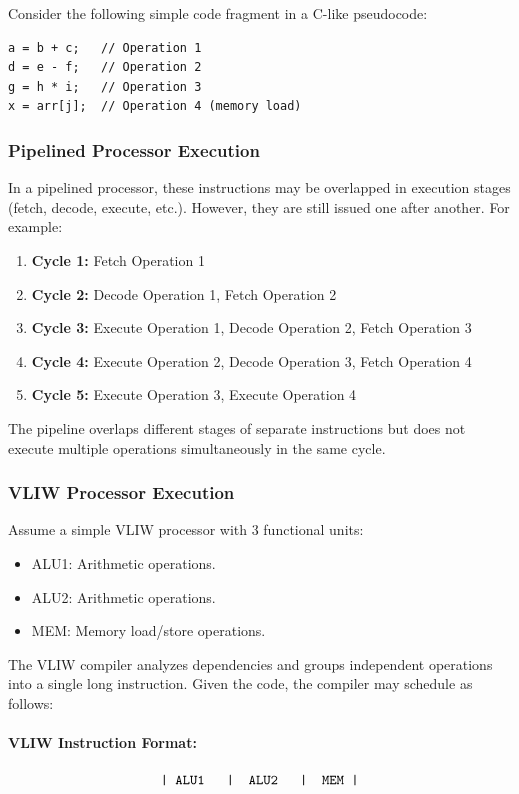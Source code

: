 Consider the following simple code fragment in a C-like pseudocode:
\begin{verbatim}
a = b + c;   // Operation 1
d = e - f;   // Operation 2
g = h * i;   // Operation 3
x = arr[j];  // Operation 4 (memory load)
\end{verbatim}

\subsubsection*{Pipelined Processor Execution}
In a pipelined processor, these instructions may be overlapped in execution stages (fetch, decode, execute, etc.). However, they are still issued one after another. For example:
\begin{enumerate}
    \item \textbf{Cycle 1:} Fetch Operation 1
    \item \textbf{Cycle 2:} Decode Operation 1, Fetch Operation 2
    \item \textbf{Cycle 3:} Execute Operation 1, Decode Operation 2, Fetch Operation 3
    \item \textbf{Cycle 4:} Execute Operation 2, Decode Operation 3, Fetch Operation 4
    \item \textbf{Cycle 5:} Execute Operation 3, Execute Operation 4
\end{enumerate}
The pipeline overlaps different stages of separate instructions but does not execute multiple operations simultaneously in the same cycle.

\subsubsection*{VLIW Processor Execution}
Assume a simple VLIW processor with 3 functional units:
\begin{itemize}
    \item ALU1: Arithmetic operations.
    \item ALU2: Arithmetic operations.
    \item MEM: Memory load/store operations.
\end{itemize}

The VLIW compiler analyzes dependencies and groups independent operations into a single long instruction. Given the code, the compiler may schedule as follows:

\paragraph{VLIW Instruction Format:}
\[
\texttt{| ALU1 \quad|\quad ALU2 \quad|\quad MEM |}
\]

